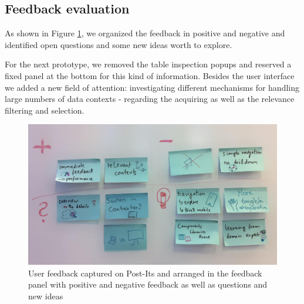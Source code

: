 \subsection{Feedback evaluation}
\label{subsec:FeedbackEvaluation}
As shown in Figure \ref{fig:user_feedback}, we organized the feedback in positive and negative and identified open questions and some new ideas worth to explore.

For the next prototype, we removed the table inspection popups and reserved a fixed panel at the bottom for this kind of information. Besides the user interface we added a new field of attention: investigating different mechanisms for handling large numbers of data contexts - regarding the acquiring as well as the relevance filtering and selection.

\begin{figure}
\begin{centering}
    \includegraphics[width=1.0\linewidth]{images/user_feedback}
    \caption{User feedback captured on Post-Its and arranged in the feedback panel with positive and negative feedback as well as questions and new ideas}
    \label{fig:user_feedback}
\end{centering}
\end{figure}